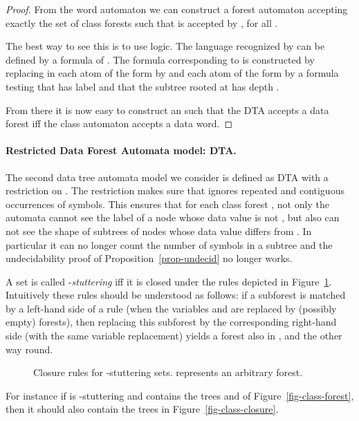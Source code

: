 \documentclass{CSML}
\newcommand\dad{\textup{DTA}\xspace}
\newcommand\wdad{\textup{DTA}\xspace}
\begin{document}
\begin{proof}
From the word automaton  we can construct a forest automaton  accepting exactly the set of
class forests  such that  is accepted by
, for all . 

The best way to see this is to use  logic. The language recognized
by  can be defined by a formula  of . The formula
corresponding to  is constructed by replacing in  each atom of
the form  by  and each atom of the form  by a formula testing that  has label  and that the
subtree rooted at  has depth .

\medskip

From there it is now easy to construct an  such that the \wdad 
accepts a data forest iff the class automaton  accepts a data word.
\end{proof}

\paragraph{Restricted Data Forest Automata model: \dad.}  
The second data tree automata model we consider is defined as \wdad with a
restriction on . The restriction makes sure that  ignores repeated
and contiguous occurrences of  symbols.  This ensures that for each class
forest , not only the automata cannot see the label of a node whose
data value is not , but also can not see the shape of subtrees of nodes
whose data value differs from . In particular it can no longer count the number
of  symbols in a subtree and the undecidability proof of
Proposition~\ref{prop-undecid} no longer works.





A set  is called -\emph{stuttering} 
iff it is closed  
under the rules depicted in Figure~\ref{fig-rules}. 
Intuitively these rules should be understood as follows: 
if a subforest is matched by a left-hand side of a rule
(when the variables  and  are replaced by (possibly empty) forests), 
then replacing this subforest by the corresponding right-hand side 
(with the same variable replacement)  
yields a forest also in ,
and the other way round. 

\begin{figure}[h!]
\footnotesize

\caption{Closure rules for -stuttering sets.  represents an arbitrary forest.}
\label{fig-rules}
\end{figure}

For instance if  is -stuttering and contains the trees  and
 of Figure~\ref{fig-class-forest}, then it should also contain the
trees in Figure~\ref{fig-class-closure}.
\end{document}
